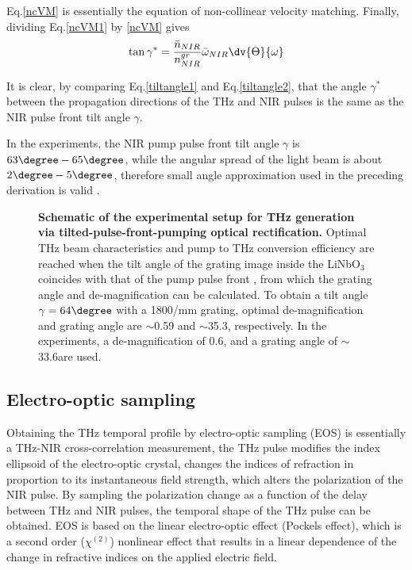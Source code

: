 Eq.\@ \ref{ncVM} is essentially the equation of non-collinear velocity matching. Finally, dividing Eq.\@ \ref{ncVM1} by \ref{ncVM} gives
\begin{equation}\label{tiltangle2}
\tan \gamma^{\ast} = \frac{\bar{n}_{NIR}}{n_{NIR}^{gr}} \bar{\omega}_{NIR} \dv{\Theta}{\omega}
\end{equation}

It is clear, by comparing Eq.\@ \ref{tiltangle1} and Eq.\@ \ref{tiltangle2}, that the angle $\gamma^{\ast}$ between the propagation directions of the THz and NIR pulses is the same as the NIR pulse front tilt angle $\gamma$. 

In the experiments, the NIR pump pulse front tilt angle $\gamma$ is $63\degree - 65\degree$, while the angular spread of the light beam is about $2\degree - 5\degree$, therefore small angle approximation used in the preceding derivation is valid \cite{ORNelsonandHebling}.

\begin{figure}[H]
	
	\centering
	\caption[Schematic of the experimental setup for THz generation via TPFP opcical rectification.]{{\bf Schematic of the experimental setup for THz generation via tilted-pulse-front-pumping optical rectification.} Optimal THz beam characteristics and pump to THz conversion efficiency are reached when the tilt angle of the grating image inside the LiNbO$_3$ coincides with that of the pump pulse front \cite{ORtheo1,ORjapan}, from which the grating angle and de-magnification can be calculated. To obtain a tilt angle $\gamma = 64 \degree$ with a 1800/mm grating, optimal de-magnification and grating angle are $\sim$0.59 and $\sim$35.3\degree, respectively. In the experiments, a de-magnification of 0.6, and a grating angle of $\sim$33.6\degree are used.}
	\label{fig:TPFPsetup}
	
\end{figure}

\newpage
\subsection{Electro-optic sampling}

Obtaining the THz temporal profile by electro-optic sampling (EOS) is essentially a THz-NIR cross-correlation measurement, the THz pulse modifies the index ellipsoid of the electro-optic crystal, changes the indices of refraction in proportion to its instantaneous field strength, which alters the polarization of the NIR pulse. By sampling the polarization change as a function of the delay between THz and NIR pulses, the temporal shape of the THz pulse can be obtained. EOS is based on the linear electro-optic effect (Pockels effect), which is a second order ($\chi^{(2)}$) nonlinear effect that results in a linear dependence of the  change in refractive indices on the applied electric field.

